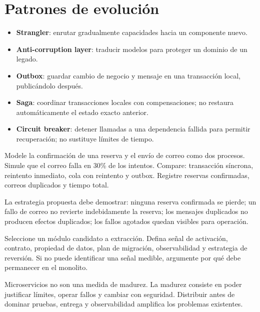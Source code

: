 \section{Patrones de evolución}
\begin{itemize}
  \item \textbf{Strangler}: enrutar gradualmente capacidades hacia un componente nuevo.
  \item \textbf{Anti-corruption layer}: traducir modelos para proteger un dominio de un legado.
  \item \textbf{Outbox}: guardar cambio de negocio y mensaje en una transacción local, publicándolo después.
  \item \textbf{Saga}: coordinar transacciones locales con compensaciones; no restaura automáticamente el estado exacto anterior.
  \item \textbf{Circuit breaker}: detener llamadas a una dependencia fallida para permitir recuperación; no sustituye límites de tiempo.
\end{itemize}

\begin{ejercicio}[title={Laboratorio. Simulación de fallos}]
Modele la confirmación de una reserva y el envío de correo como dos procesos. Simule que el correo falla en 30\% de los intentos. Compare: transacción síncrona, reintento inmediato, cola con reintento y outbox. Registre reservas confirmadas, correos duplicados y tiempo total.
\end{ejercicio}

\begin{validacion}
La estrategia propuesta debe demostrar: ninguna reserva confirmada se pierde; un fallo de correo no revierte indebidamente la reserva; los mensajes duplicados no producen efectos duplicados; los fallos agotados quedan visibles para operación.
\end{validacion}

\begin{ejercicio}[title={Ejercicio de arquitectura}]
Seleccione un módulo candidato a extracción. Defina señal de activación, contrato, propiedad de datos, plan de migración, observabilidad y estrategia de reversión. Si no puede identificar una señal medible, argumente por qué debe permanecer en el monolito.
\end{ejercicio}

\begin{riesgo}
Microservicios no son una medida de madurez. La madurez consiste en poder justificar límites, operar fallos y cambiar con seguridad. Distribuir antes de dominar pruebas, entrega y observabilidad amplifica los problemas existentes.
\end{riesgo}
